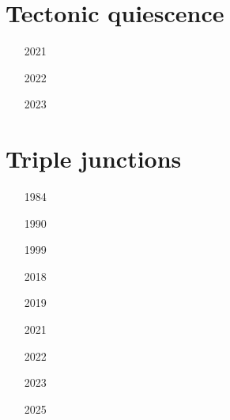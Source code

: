 
\section{Tectonic quiescence} 

\begin{small}
\begin{itemize}
\item[2021] 
\item[2022] 
\item[2023]  
\end{itemize}
\end{small}

\section{Triple junctions} 

\begin{small}
\begin{itemize}
\item[1984]
\\
\item[1990]
\item[1999]
\item[2018]
\item[2019] 
\item[2021]
\item[2022]
\item[2023]
\\
\item[2025]
\end{itemize}
\end{small}


